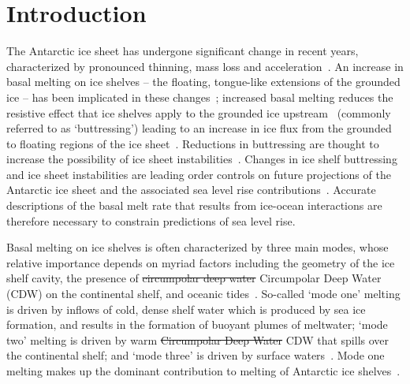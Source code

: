 \documentclass[openacc]{rsproca_new}%
\newcommand{\red}[1]{{\color{red} #1}}
\newcommand{\blue}[1]{{\color{blue} #1}}
\newcommand{\rout}[1]{\red{\st{#1}}}\newcommand{\ab}[1]{\textcolor{Green}{#1}}\newcommand{\about}[1]{\textcolor{Cyan}{\sout{#1}}}
\begin{document}
\begin{fmtext}

\end{fmtext}
\maketitle
\section{Introduction}\label{S:Introduction}
The Antarctic ice sheet has undergone significant change in recent years, characterized by pronounced thinning, mass loss and acceleration~\cite[e.g.][]{Pritchard2012Nature, Mouginot2014GRL}. An increase in basal melting on ice shelves -- the floating, tongue-like extensions of the grounded ice -- has been implicated in these changes~\cite{Shepherd2004GRL}; increased basal melting reduces the resistive effect that ice shelves apply to the grounded ice upstream~\cite{Gagliardini2010GRL} (commonly referred to as `buttressing') leading to an increase \blue{in} ice flux from the grounded to floating regions of the ice sheet~\cite{Gudmundsson2013Cryo}. Reductions in buttressing are thought to increase the possibility of ice sheet instabilities~\cite{Schoof2007JGeophysResEarth}. Changes in ice shelf buttressing and ice sheet instabilities are leading order controls on future projections of the Antarctic ice sheet and the associated sea level rise contributions~\cite{Arthern2017GRL}. Accurate descriptions of the basal melt rate that results from ice-ocean interactions are therefore necessary to constrain predictions of sea level rise. 

Basal melting on ice shelves is often characterized by three main modes, whose relative importance depends on myriad factors including the geometry of the ice shelf cavity, the presence of \rout{circumpolar deep water}\blue{Circumpolar Deep Water (CDW)} on the continental shelf, and oceanic tides~\cite{Jacobs1992JGlac}. So-called `mode one' melting is driven by inflows of cold, dense shelf water which is produced by sea ice formation, and results in the formation of buoyant plumes of meltwater; `mode two' melting is driven by warm \rout{Circumpolar Deep Water}\blue{CDW} that spills over the continental shelf; and `mode three' is driven by surface waters~\cite{Silvano2016Oceanography}. Mode one melting makes up the dominant contribution to melting of Antarctic ice shelves~\cite{Adusumilli2020NatureGeo}.
\end{document}
